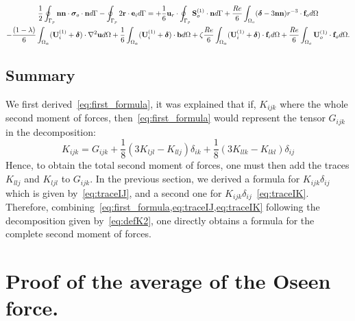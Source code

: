 \begin{multline}
    \frac{1}{2}\intS[p]{\textbf{nn} \cdot  \bm\sigma_{o}\cdot \textbf{n}}
    - \intS[p]{2 \textbf{r}\cdot \textbf{e}_i}
    =
    +\frac{1}{6}
    \textbf{u}_{r}\cdot  \intS[p]{\textbf{S}_{o}^{(1)}\cdot \textbf{n}}
    + \frac{Re}{6}\intO[o]{(\bm\delta - 3\textbf{nn})r^{-3}\cdot \textbf{f}_{o}}\\
    - \frac{(1-\lambda)}{6} \intO{(\textbf{U}_{i}^{(1)} + \bm\delta)\cdot \grad^2 \textbf{u}} 
    + \frac{1}{6} \intO{(\textbf{U}_{i}^{(1)} + \bm\delta)\cdot \textbf{b}} 
    + \zeta \frac{Re}{6} \intO{(\textbf{U}_{i}^{(1)} + \bm\delta)\cdot \textbf{f}_{i}} 
    + \frac{Re}{6}\intO[o]{\textbf{U}_{o}^{(1)}\cdot \textbf{f}_{o}}.
    \label{eq:traceIK}
\end{multline}
\subsection{Summary}

We first derived~\ref{eq:first_formula}, it was explained that if, $K_{ijk}$ where the whole second moment of forces, then~\ref{eq:first_formula} would represent the tensor $G_{ijk}$ in the decomposition:
\begin{equation}
    K_{ijk}
    = G_{ijk} 
    + \frac{1}{8}(3K_{ljl}
    - K_{llj})\delta_{ik}
    + \frac{1}{8}(3K_{llk} 
    - K_{lkl})\delta_{ij} 
    \label{eq:defK2}
\end{equation}
Hence, to obtain the total second moment of forces, one must then add the traces $K_{llj}$ and $K_{ljl}$ to $G_{ijk}$. 
In the previous section, we derived a formula for $K_{ijk}\delta_{ij}$ which is given by~\ref{eq:traceIJ}, and a second one for $K_{ijk}\delta_{ij}$~\eqref{eq:traceIK}.
Therefore, combining~\ref{eq:first_formula,eq:traceIJ,eq:traceIK} following the decomposition given by~\ref{eq:defK2}, one directly obtains a formula for the complete second moment of forces. 


\section{Proof of the average of the Oseen force. }
\label{ap:varience}

